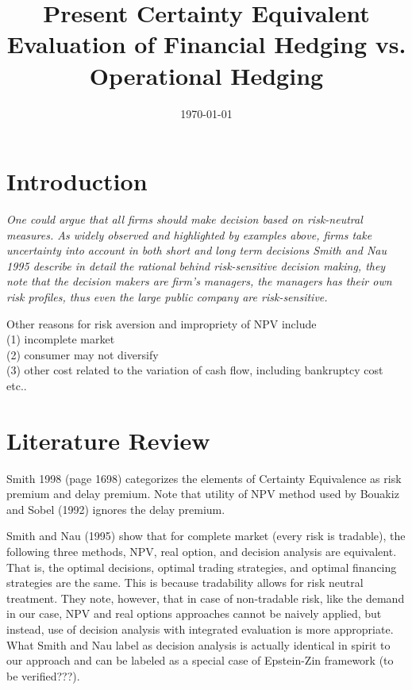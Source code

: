 \documentclass{article}[12pt letter]
\date{\today}
\title{Present Certainty Equivalent Evaluation of Financial Hedging vs. Operational Hedging}
\begin{document}
\doublespacing

\maketitle
\bigskip





\section{Introduction}

\emph{ One could argue that all firms should make decision based on risk-neutral measures. As widely observed and highlighted by examples above, firms take uncertainty into account in both short and long term decisions Smith and Nau 1995 describe in detail the rational behind risk-sensitive decision making, they note that the decision makers are firm's managers, the managers has their own risk profiles, thus even the large public company are risk-sensitive.}

Other reasons for risk aversion and impropriety of NPV include \\
(1) incomplete market\\ 
(2) consumer may not diversify\\
(3) other cost related to the variation of cash flow, including bankruptcy cost etc..


\section{Literature Review}

Smith 1998 (page 1698) categorizes  the elements of Certainty Equivalence as risk premium and delay premium. Note that utility of NPV method used by Bouakiz and Sobel (1992) ignores the delay premium.


Smith and Nau (1995) show that for complete market (every risk is tradable), the following three methods, NPV, real option, and decision analysis are equivalent. That is, the optimal decisions, optimal trading strategies, and optimal financing strategies are the same. This is because tradability allows for risk neutral treatment. They note, however, that in case of non-tradable risk, like the demand in our case,  NPV and real options approaches cannot be naively applied, but instead, use of decision analysis with integrated evaluation is more appropriate. What Smith and Nau label as decision analysis is actually identical in spirit to our approach and can be labeled as a special case of Epstein-Zin framework (to be verified???).
\end{document}

